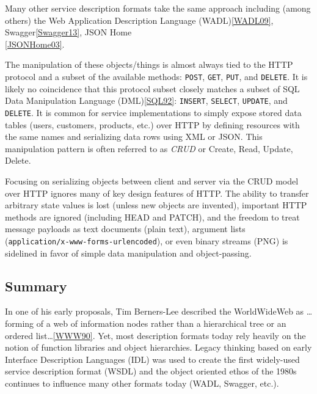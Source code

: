 \documentclass{wsrest2014}
\begin{document}
 \par{}Many other service description formats take the same approach including (among others) the Web Application Description Language (WADL)\hyperlink{WADL09}{[WADL09]}, Swagger\hyperlink{Swagger13}{[Swagger13]}, JSON Home\\\hyperlink{JSONHome03}{[JSONHome03]}.
 \par{}The manipulation of these objects/things is almost always tied to the HTTP protocol and a subset of the available methods: \texttt{POST}, \texttt{GET}, \texttt{PUT}, and \texttt{DELETE}. It is likely no coincidence that this protocol subset closely matches a subset of SQL Data Manipulation Language (DML)\hyperlink{SQL92}{[SQL92]}: \texttt{INSERT}, \texttt{SELECT}, \texttt{UPDATE}, and \texttt{DELETE}. It is common for service implementations to simply expose stored data tables (users, customers, products, etc.) over HTTP by defining resources with the same names and serializing data rows using XML or JSON. This manipulation pattern is often referred to as \emph{CRUD} or Create, Read, Update, Delete.
 \par{}Focusing on serializing objects between client and server via the CRUD model over HTTP ignores many of key design features of HTTP. The ability to transfer arbitrary state values is lost (unless new objects are invented), important HTTP methods are ignored (including HEAD and PATCH), and the freedom to treat message payloads as text documents (plain text), argument lists (\texttt{application/x-www-forms-urlencoded}), or even binary streams (PNG) is sidelined in favor of simple data manipulation and object-passing.
\hypertarget{_summary}{}
\subsection{Summary}
\label{_summary}
 \par{}In one of his early proposals, Tim Berners-Lee described the WorldWideWeb as \textquotedbl{}\dots{}forming of a web of information nodes rather than a hierarchical tree or an ordered list\dots{}\textquotedbl{}\hyperlink{WWW90}{[WWW90]}. Yet, most description formats today rely heavily on the notion of function libraries and object hierarchies. Legacy thinking based on early Interface Description Languages (IDL) was used to create the first widely-used service description format (WSDL) and the object oriented ethos of the 1980s continues to influence many other formats today (WADL, Swagger, etc.).
\hypertarget{_shortcomings_of_existing_formats}{}
\end{document}
